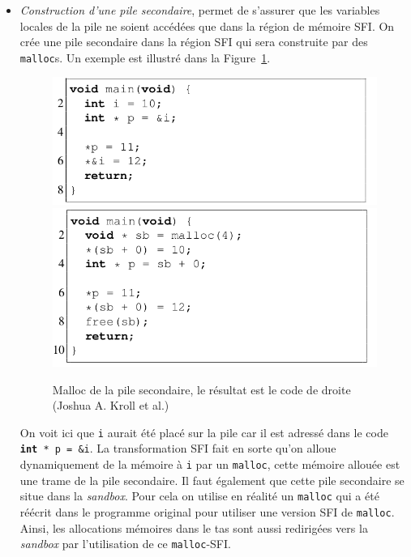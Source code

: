 \documentclass[11pt]{sdm}
\begin{document}
\begin{itemize}
	\item \textit{Construction d'une pile secondaire}, permet de s'assurer que les variables locales de la pile ne soient accédées que dans la région de mémoire SFI. On crée une pile secondaire dans la région SFI qui sera construite par des \texttt{malloc}s. Un exemple est illustré dans la Figure~\ref{shadow_stack}.
	
	
\begin{figure}[b]
\centering
\includegraphics[scale=0.33]{images/before_shadow.png}
\includegraphics[scale=0.33]{images/after_shadow.png}
\caption{Malloc de la pile secondaire, le résultat est le code de droite (Joshua A. Kroll et al.)}
\label{shadow_stack}
\end{figure}


On voit ici que \texttt{i} aurait été placé sur la pile car il est adressé dans le code \texttt{\textbf{int}~*~p~=~\&i}. La transformation SFI fait en sorte qu'on alloue dynamiquement de la mémoire à \texttt{i} par un \texttt{malloc}, cette mémoire allouée est une trame de la pile secondaire. Il faut également que cette pile secondaire se situe dans la \textit{sandbox}. Pour cela on utilise en réalité un \texttt{malloc} qui a été réécrit dans le programme original pour utiliser une version SFI de \texttt{malloc}. Ainsi, les allocations mémoires dans le tas sont aussi redirigées vers la \textit{sandbox} par l'utilisation de ce \texttt{malloc}-SFI.


\end{itemize}
\end{document}
